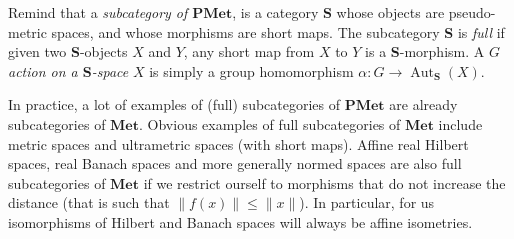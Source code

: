 \documentclass[a4paper]{article}
\theoremstyle{definition}
\newtheorem{defn}[lem]{Definition}
\DeclareMathOperator\Aut{Aut}
\newcommand*{\category}[1]{\textbf{#1}}
\newcommand*{\PMet}{\category{PMet}}
\newcommand*{\CatS}{\category{S}}
\begin{document}
Remind that a \emph{subcategory of $\PMet$}, is a category $\category S$ whose objects are pseudo-metric spaces, and whose morphisms are short maps.
The subcategory \CatS{} is \emph{full} if given two \CatS-objects $X$ and $Y$, any short map from $X$ to $Y$ is a \CatS-morphism.
A \emph{$G$ action on a $\category S$-space} $X$ is simply a group homomorphism $\alpha\colon G\to\Aut_{\CatS}(X)$.
%
%

In practice, a lot of examples of (full) subcategories of $\PMet$ are already subcategories of $\category{Met}$.
Obvious examples of full subcategories of $\category{Met}$ include metric spaces and ultrametric spaces (with short maps).
Affine real Hilbert spaces, real Banach spaces and more generally normed spaces are also full subcategories of $\category{Met}$ if we restrict ourself to morphisms that do not increase the distance (that is such that  $\|f(x)\|\leq\| x\|$).
In particular, for us isomorphisms of Hilbert and Banach spaces will always be affine isometries.
\end{document}
